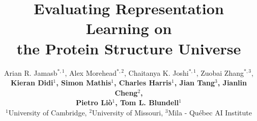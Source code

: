 \documentclass{article} %
\title{Evaluating Representation Learning on \\ the Protein Structure Universe}
\author{%
  Arian R. Jamasb$^{*,1}$, \quad Alex Morehead$^{*,2}$, \quad Chaitanya K. Joshi$^{*,1}$, \quad Zuobai Zhang$^{*,3}$,\\ 
  \textbf{Kieran Didi$^{1}$, \quad Simon Mathis$^{1}$, \quad Charles Harris$^{1}$, \quad Jian Tang$^{3}$, \quad Jianlin Cheng$^{2}$,} \\ 
  \textbf{Pietro Liò$^{1}$, \quad Tom L. Blundell$^{1}$} \vspace{5pt} \\
  $^{1}$University of Cambridge, \quad $^{2}$University of Missouri, \quad $^{3}$Mila - Qu\'ebec AI Institute \vspace{5pt} \\
}
\begin{document}
\maketitle
\def\thefootnote{*}

\begin{abstract}

\end{abstract}


% 










\newpage
\appendix

\end{document}
